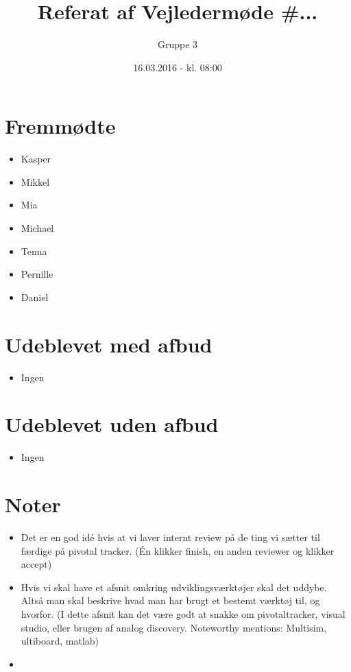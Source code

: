 \documentclass{article}
\title{Referat af Vejledermøde \#...}
\author{Gruppe 3}
\date{16.03.2016 - kl. 08:00}
\begin{document}
	\maketitle
	
	\section{Fremmødte}
	\begin{itemize}
		\item Kasper
		\item Mikkel
		\item Mia
		\item Michael
		\item Tenna
		\item Pernille
		\item Daniel
	\end{itemize}
	
	\section{Udeblevet med afbud}
	\begin{itemize}
		\item Ingen
	\end{itemize}
	
	\section{Udeblevet uden afbud}
	\begin{itemize}
		\item Ingen
	\end{itemize}
	
	\section{Noter}
	\begin{itemize}
		\item Det er en god idé hvis at vi laver internt review på de ting vi sætter til færdige på pivotal tracker. (Én klikker finish, en anden reviewer og klikker accept)
		\item Hvis vi skal have et afsnit omkring udviklingsværktøjer skal det uddybe. Altså man skal beskrive hvad man har brugt et bestemt værktøj til, og hvorfor. (I dette afsnit kan det være godt at snakke om pivotaltracker, visual studio, eller brugen af analog discovery. Noteworthy mentions: Multisim, ultiboard, matlab)
		\item 
	\end{itemize}
\end{document}
